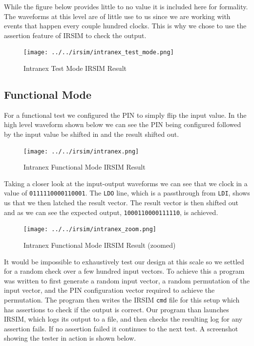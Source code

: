     While the figure below provides little to no value it is included here for
    formality. The waveforms at this level are of little use to us since we are
    working with events that happen every couple hundred clocks.  This is why
    we chose to use the assertion feature of IRSIM to check the output.
    \begin{figure}[H]
        \centering
        \texttt{[image: ../../irsim/intranex\_test\_mode.png]}
        \caption{Intranex Test Mode IRSIM Result}
    \end{figure}

    \newpage
    \subsection{Functional Mode}
    For a functional test we configured the PIN to simply flip the input value.
    In the high level waveform shown below we can see the PIN being configured
    followed by the input value be shifted in and the result shifted out.
    \begin{figure}[H]
        \centering
        \texttt{[image: ../../irsim/intranex.png]}
        \caption{Intranex Functional Mode IRSIM Result}
    \end{figure}

    Taking a closer look at the input-output waveforms we can see that we clock
    in a value of \texttt{0111110000110001}. The \texttt{LDO} line, which is a
    passthrough from \texttt{LDI}, shows us that we then latched the result
    vector. The result vector is then shifted out and as we can see the
    expected output, \texttt{1000110000111110}, is achieved.
    \begin{figure}[H]
        \centering
        \texttt{[image: ../../irsim/intranex\_zoom.png]}
        \caption{Intranex Functional Mode IRSIM Result (zoomed)}
    \end{figure}

    \newpage
    It would be impossible to exhaustively test our design at this scale so we
    settled for a random check over a few hundred input vectors. To achieve
    this a program was written to first generate a random input vector, a
    random permutation of the input vector, and the PIN configuration vector
    required to achieve the permutation. The program then writes the IRSIM
    \texttt{cmd} file for this setup which has assertions to check if the
    output is correct. Our program than launches IRSIM, which logs its output
    to a file, and then checks the resulting log for any assertion fails. If
    no assertion failed it continues to the next test. A screenshot showing the
    tester in action is shown below.

